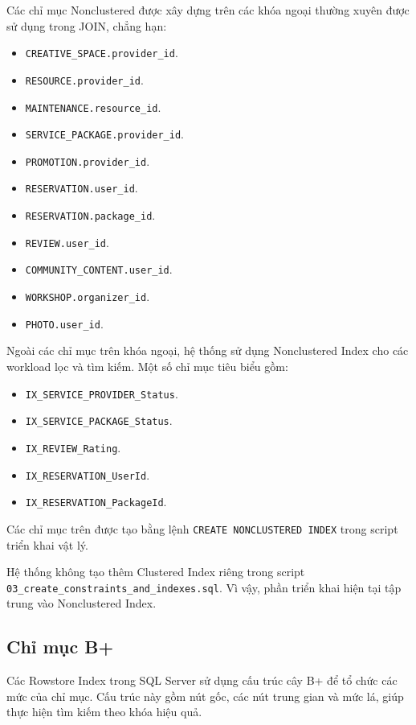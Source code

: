 Các chỉ mục Nonclustered được xây dựng trên các khóa ngoại thường xuyên được
sử dụng trong JOIN, chẳng hạn:

\begin{itemize}
	\item \texttt{CREATIVE\_SPACE.provider\_id}.
	\item \texttt{RESOURCE.provider\_id}.
	\item \texttt{MAINTENANCE.resource\_id}.
	\item \texttt{SERVICE\_PACKAGE.provider\_id}.
	\item \texttt{PROMOTION.provider\_id}.
	\item \texttt{RESERVATION.user\_id}.
	\item \texttt{RESERVATION.package\_id}.
	\item \texttt{REVIEW.user\_id}.
	\item \texttt{COMMUNITY\_CONTENT.user\_id}.
	\item \texttt{WORKSHOP.organizer\_id}.
	\item \texttt{PHOTO.user\_id}.
\end{itemize}

Ngoài các chỉ mục trên khóa ngoại, hệ thống sử dụng Nonclustered Index cho
các workload lọc và tìm kiếm. Một số chỉ mục tiêu biểu gồm:

\begin{itemize}
	\item \texttt{IX\_SERVICE\_PROVIDER\_Status}.
	\item \texttt{IX\_SERVICE\_PACKAGE\_Status}.
	\item \texttt{IX\_REVIEW\_Rating}.
	\item \texttt{IX\_RESERVATION\_UserId}.
	\item \texttt{IX\_RESERVATION\_PackageId}.
\end{itemize}

Các chỉ mục trên được tạo bằng lệnh \texttt{CREATE NONCLUSTERED INDEX}
trong script triển khai vật lý.

Hệ thống không tạo thêm Clustered Index riêng trong script
\texttt{03\_create\_constraints\_and\_indexes.sql}. Vì vậy, phần triển khai
hiện tại tập trung vào Nonclustered Index.

\subsection{Chỉ mục B+}

Các Rowstore Index trong SQL Server sử dụng cấu trúc cây B+ để tổ chức các
mức của chỉ mục. Cấu trúc này gồm nút gốc, các nút trung gian và mức lá,
giúp thực hiện tìm kiếm theo khóa hiệu quả.

